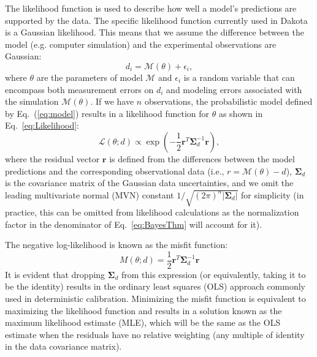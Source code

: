 The likelihood function is used to describe how well a model's
predictions are supported by the data.  
The specific likelihood function currently used in Dakota is a Gaussian
likelihood. This means that we assume the difference between the model
(e.g. computer simulation) and the experimental observations are Gaussian:
\begin{equation}
d_i = \mathcal{M}(\theta) + \epsilon_i, \label{eq:model}
\end{equation}
where $\theta$ are the parameters of model $\mathcal{M}$ and
$\epsilon_i$ is a random variable that can encompass both measurement
errors on $d_i$ and modeling errors associated with the simulation
$\mathcal{M}(\theta)$. %
If we have $n$ observations, the probabilistic model defined by 
Eq.~(\ref{eq:model}) results in a likelihood function for $\theta$ 
as shown in Eq.~\ref{eq:Likelihood}:
\begin{equation}
\mathcal{L}(\theta;d) \propto %
\exp \left(
-\frac{1}{2} \boldsymbol{r}^T \boldsymbol{\Sigma}_d^{-1} \boldsymbol{r} 
\right), \label{eq:Likelihood}
\end{equation}
where the residual vector $\boldsymbol{r}$ is defined from the
differences between the model predictions and the corresponding
observational data (i.e., $r = \mathcal{M}(\theta) - d$), 
$\boldsymbol{\Sigma}_d$ is the covariance matrix of the Gaussian data
uncertainties, and we omit the leading multivariate normal (MVN)
constant $1/\sqrt{(2\pi)^n |\boldsymbol{\Sigma}_d|}$
for simplicity (in practice, this can be omitted from likelihood
calculations as the normalization factor in the denominator of 
Eq.~\ref{eq:BayesThm} will account for it).

The negative log-likelihood is known as the misfit function:
\begin{equation}
M(\theta;d) = \frac{1}{2} \boldsymbol{r}^T \boldsymbol{\Sigma}_d^{-1} 
\boldsymbol{r} %
\label{eq:misfit}
\end{equation}
It is evident that dropping $\boldsymbol{\Sigma}_d$ from this
expression (or equivalently, taking it to be the identity) results in
the ordinary least squares (OLS) approach commonly used in
deterministic calibration.  Minimizing the misfit function is
equivalent to maximizing the likelihood function and results in a
solution known as the maximum likelihood estimate (MLE), which will be
the same as the OLS estimate when the residuals have no relative
weighting (any multiple of identity in the data covariance matrix).

